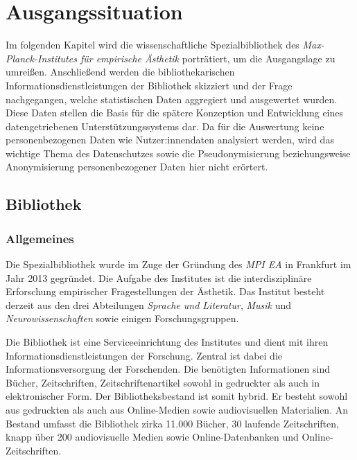 \chapter{Ausgangssituation}
\label{chap:three}
Im folgenden Kapitel wird die wissenschaftliche Spezialbibliothek des \textit{Max-Planck-Institutes für empirische Ästhetik} porträtiert,
um die Ausgangslage zu umreißen.
Anschließend werden die bibliothekarischen Informationsdienstleistungen der Bibliothek skizziert und der Frage nachgegangen, 
welche statistischen Daten aggregiert und ausgewertet wurden. Diese Daten stellen die Basis für die spätere Konzeption und Entwicklung eines datengetriebenen Unterstützungssystems dar.
Da für die Auswertung keine personenbezogenen Daten wie Nutzer:innendaten analysiert werden, wird das wichtige Thema des Datenschutzes sowie
die Pseudonymisierung beziehungsweise Anonymisierung personenbezogener Daten hier nicht erörtert. 

\section{Bibliothek}
\label{chap:three_one}
\subsection{Allgemeines}
Die Spezialbibliothek wurde im Zuge der Gründung des \textit{\acrshort{MPI EA}}
in Frankfurt im Jahr 2013 gegründet. Die Aufgabe des Institutes ist die interdisziplinäre Erforschung 
empirischer Fragestellungen der Ästhetik. Das Institut besteht derzeit aus den drei Abteilungen \textit{Sprache und Literatur}, 
\textit{Musik} und \textit{Neurowissenschaften} sowie einigen Forschungsgruppen. %



Die Bibliothek ist eine Serviceeinrichtung des Institutes und dient mit ihren Informationsdienstleistungen 
der Forschung.
Zentral ist dabei die Informationsversorgung der Forschenden. Die benötigten Informationen sind Bücher, 
Zeitschriften, Zeitschriftenartikel sowohl in gedruckter als auch in elektronischer Form.
Der Bibliotheksbestand ist somit hybrid. Er besteht sowohl aus gedruckten als auch aus Online-Medien sowie 
audiovisuellen Materialien. An Bestand umfasst die Bibliothek zirka 11.000 Bücher, 30 laufende Zeitschriften, 
knapp über 200 audiovisuelle Medien sowie Online-Datenbanken
und Online-Zeitschriften.

